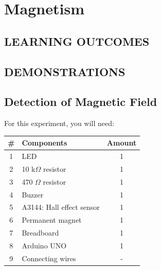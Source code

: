 \chapter{Magnetism}

\section*{LEARNING OUTCOMES}
{
\begin{center}
\end{center}
}

\section*{DEMONSTRATIONS}
\section*{Detection of Magnetic Field}
For this experiment, you will need:

\begin{table}[H]
    \centering
    \begin{tabular}{|c|l|c|}\hline
     \textbf{\#} & \textbf{Components}  &  \textbf{Amount}\\\hline
     1 & LED                            & 1\\\hline
     2 & 10 k$\Omega$ resistor           & 1\\\hline
     3 & 470 $\Omega$ resistor           & 1\\\hline
     4 & Buzzer                         & 1\\\hline
     5 & A3144: Hall effect sensor      & 1\\\hline
     6 & Permanent magnet               & 1\\\hline
     7 & Breadboard                     & 1\\\hline
     8 & Arduino UNO                    & 1\\\hline
     9 & Connecting wires               & - \\\hline
    \end{tabular}
\end{table}

